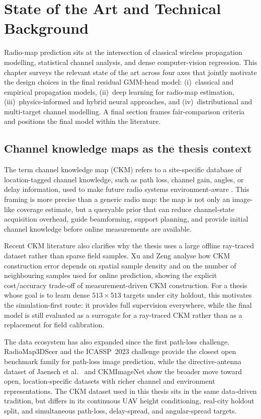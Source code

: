 \chapter[State of the Art]{State of the Art and Technical Background}

Radio-map prediction sits at the intersection of classical wireless propagation
modelling, statistical channel analysis, and dense computer-vision regression.
This chapter surveys the relevant state of the art across four axes that jointly
motivate the design choices in the final residual GMM-head model: (i)~classical and empirical propagation
models, (ii)~deep learning for radio-map estimation, (iii)~physics-informed and
hybrid neural approaches, and (iv)~distributional and multi-target channel
modelling. A final section frames fair-comparison criteria and positions the final model
within the literature.

\section{Channel knowledge maps as the thesis context}
\label{sec:soa_ckm_context}

The term channel knowledge map (CKM) refers to a site-specific database of
location-tagged channel knowledge, such as path loss, channel gain, angles, or
delay information, used to make future radio systems environment-aware
\cite{zengx2021ckm,ckmtutorial2024}. This framing is more precise than a
generic radio map: the map is not only an image-like coverage estimate, but a
queryable prior that can reduce channel-state acquisition overhead, guide
beamforming, support planning, and provide initial channel knowledge before
online measurements are available.

Recent CKM literature also clarifies why the thesis uses a large offline
ray-traced dataset rather than sparse field samples. Xu and Zeng
\cite{ckmdata2024} analyse how CKM construction error depends on spatial sample
density and on the number of neighbouring samples used for online prediction,
showing the explicit cost/accuracy trade-off of measurement-driven CKM
construction. For a thesis whose goal is to learn dense \(513\times513\)
targets under city holdout, this motivates the simulation-first route: it
provides full supervision everywhere, while the final model is still evaluated
as a surrogate for a ray-traced CKM rather than as a replacement for field
calibration.

The data ecosystem has also expanded since the first path-loss challenge.
RadioMap3DSeer \cite{dataset2212} and the ICASSP~2023 challenge
\cite{icassp2023challenge} provide the closest open benchmark family for
path-loss image prediction, while the directive-antenna dataset of Jaensch et
al.\ \cite{jaensch2024directiverme} and CKMImageNet
\cite{ckmimagenet2025} show the broader move toward open, location-specific
datasets with richer channel and environment representations. The CKM dataset
used in this thesis sits in the same data-driven tradition, but differs in its
continuous UAV height conditioning, real-city holdout split, and simultaneous
path-loss, delay-spread, and angular-spread targets.

